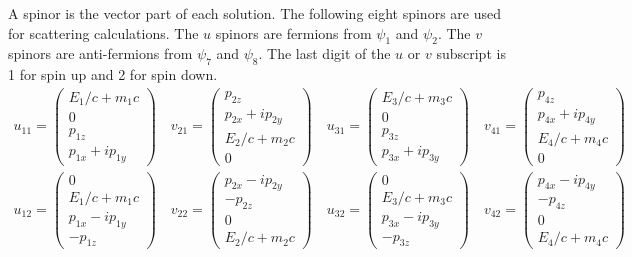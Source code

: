 \documentclass[12pt]{article}
\begin{document}
\noindent
A spinor is the vector part of each solution.
The following eight spinors are used for scattering calculations.
The $u$ spinors are fermions from $\psi_1$ and $\psi_2$.
The $v$ spinors are anti-fermions from $\psi_7$ and $\psi_8$.
The last digit of the $u$ or $v$ subscript is 1 for spin up and 2 for spin down.
\begin{gather*}
u_{11}=\begin{pmatrix}E_1/c+m_1c\\0\\p_{1z}\\p_{1x}+ip_{1y}\end{pmatrix}\quad
v_{21}=\begin{pmatrix}p_{2z}\\p_{2x}+ip_{2y}\\E_2/c+m_2c\\0\end{pmatrix}\quad
u_{31}=\begin{pmatrix}E_3/c+m_3c\\0\\p_{3z}\\p_{3x}+ip_{3y}\end{pmatrix}\quad
v_{41}=\begin{pmatrix}p_{4z}\\p_{4x}+ip_{4y}\\E_4/c+m_4c\\0\end{pmatrix}
\\
u_{12}=\begin{pmatrix}0\\E_1/c+m_1c\\p_{1x}-ip_{1y}\\-p_{1z}\end{pmatrix}\quad
v_{22}=\begin{pmatrix}p_{2x}-ip_{2y}\\-p_{2z}\\0\\E_2/c+m_2c\end{pmatrix}\quad
u_{32}=\begin{pmatrix}0\\E_3/c+m_3c\\p_{3x}-ip_{3y}\\-p_{3z}\end{pmatrix}\quad
v_{42}=\begin{pmatrix}p_{4x}-ip_{4y}\\-p_{4z}\\0\\E_4/c+m_4c\end{pmatrix}
\end{gather*}
\end{document}
